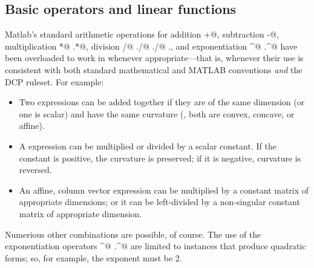 \documentclass[12pt]{article}
\begin{document}
\subsection{Basic operators and linear functions}

Matlab's standard arithmetic operations for
addition \verb@+@, subtraction \verb@-@, multiplication
\verb@*@ \verb@.*@, division \verb@/@ \verb@\@ \verb@./@
\verb@./@ \verb@.\@, and exponentiation \verb@^@ \verb@.^@
have been overloaded to work in \cvx whenever appropriate---that
is, whenever their use is consistent with both standard mathematical
and MATLAB conventions \emph{and} the DCP ruleset.
For example:
\begin{itemize}
\item Two \cvx expressions can be added together if they are of the same
      dimension (or one is scalar) and have the same curvature (\ie, 
      both are convex, concave, or affine).
\item A \cvx expression can be multiplied or divided by a scalar constant. If the
      constant is positive, the curvature is preserved; if it is negative,
      curvature is reversed.      
\item An affine, column vector \cvx expression can be multiplied by a constant matrix
      of appropriate dimensions; or it can be left-divided by a non-singular 
      constant matrix of appropriate dimension.
\end{itemize}
Numerious other combinations are possible, of course.
The use of the exponentiation operators \verb@^@ \verb@.^@ are limited
to instances that produce quadratic forms; so, for example, the exponent
must be 2.
\end{document}

